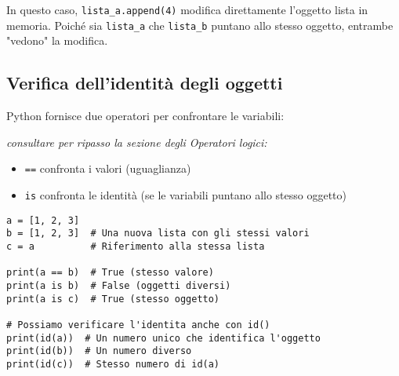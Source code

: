 In questo caso, \texttt{lista\_a.append(4)} modifica direttamente l'oggetto lista in memoria. Poiché sia \texttt{lista\_a} che \texttt{lista\_b} puntano allo stesso oggetto, entrambe "vedono" la modifica.

\subsection{Verifica dell'identità degli oggetti}

Python fornisce due operatori per confrontare le variabili:

\textit{consultare per ripasso la sezione degli Operatori logici: \textbf{}}
\begin{itemize}
    \item \texttt{==} confronta i valori (uguaglianza)
    \item \texttt{is} confronta le identità (se le variabili puntano allo stesso oggetto)
\end{itemize}

\begin{lstlisting}
a = [1, 2, 3]
b = [1, 2, 3]  # Una nuova lista con gli stessi valori
c = a          # Riferimento alla stessa lista

print(a == b)  # True (stesso valore)
print(a is b)  # False (oggetti diversi)
print(a is c)  # True (stesso oggetto)

# Possiamo verificare l'identita anche con id()
print(id(a))  # Un numero unico che identifica l'oggetto
print(id(b))  # Un numero diverso
print(id(c))  # Stesso numero di id(a)
\end{lstlisting}

\begin{center}
\end{center}


